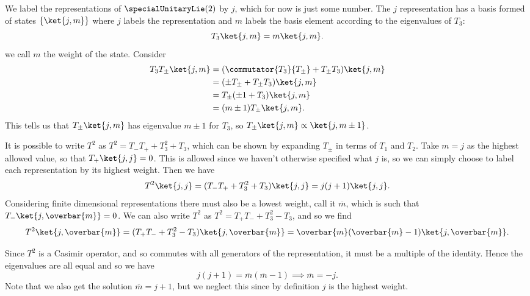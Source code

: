 \documentclass[fleqn]{NotesClass}
\begin{document}
    We label the representations of \(\specialUnitaryLie(2)\) by \(j\), which for now is just some number.
    The \(j\) representation has a basis formed of states \(\{\ket{j, m}\}\) where \(j\) labels the representation and \(m\) labels the basis element according to the eigenvalues of \(T_3\):
    \begin{equation}
        T_3 \ket{j, m} = m\ket{j, m}.
    \end{equation}
    we call \(m\) the weight of the state.
    Consider
    \begin{align}
        T_3T_{\pm} \ket{j, m} &= (\commutator{T_3}{T_{\pm}} + T_{\pm}T_3)\ket{j, m}\\
        &= (\pm T_{\pm} + T_{\pm} T_3)\ket{j, m}\\
        &= T_{\pm}(\pm 1 + T_3)\ket{j, m}\\
        &= (m \pm 1) T_{\pm}\ket{j, m}.
    \end{align}
    This tells us that \(T_{\pm}\ket{j, m}\) has eigenvalue \(m \pm 1\) for \(T_3\), so \(T_{\pm}\ket{j, m} \propto \ket{j, m \pm 1}\).
    
    It is possible to write \(T^2\) as \(T^2 = T_- T_+ + T_3^2 + T_3\), which can be shown by expanding \(T_{\pm}\) in terms of \(T_1\) and \(T_2\).
    Take \(m = j\) as the highest allowed value, so that \(T_+\ket{j, j} = 0\).
    This is allowed since we haven't otherwise specified what \(j\) is, so we can simply choose to label each representation by its highest weight.
    Then we have
    \begin{equation}
        T^2\ket{j, j} = (T_-T_+ + T_3^2 + T_3) \ket{j, j} = j(j  + 1)\ket{j, j}.
    \end{equation}
    Considering finite dimensional representations there must also be a lowest weight, call it \(\overbar{m}\), which is such that \(T_- \ket{j, \overbar{m}} = 0\).
    We can also write \(T^2\) as \(T^2 = T_+ T_- + T_3^2 - T_3\), and so we find
    \begin{equation}
        T^2\ket{j, \overbar{m}} = (T_+T_- + T_3^2 - T_3) \ket{j, \overbar{m}} = \overbar{m}(\overbar{m} - 1) \ket{j, \overbar{m}}.
    \end{equation}
    
    Since \(T^2\) is a Casimir operator, and so commutes with all generators of the representation, it must be a multiple of the identity.
    Hence the eigenvalues are all equal and so we have
    \begin{equation}
        j(j + 1) = \overbar{m}(\overbar{m} - 1) \implies \overbar{m} = -j.
    \end{equation}
    Note that we also get the solution \(\overbar{m} = j + 1\), but we neglect this since by definition \(j\) is the highest weight.
    
\end{document}
